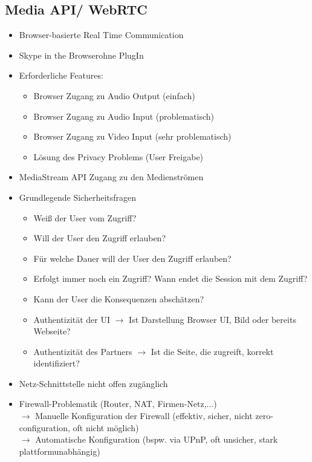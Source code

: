 \documentclass{article} %
\begin{document}
	\subsection{Media API/ WebRTC}
		\begin{itemize}
			\item Browser-basierte Real Time Communication
			\item \glqq Skype in the Browser\grqq ohne PlugIn
			\item Erforderliche Features:
			\begin{itemize}
				\item Browser Zugang zu Audio Output (einfach)
				\item Browser Zugang zu Audio Input (problematisch)
				\item Browser Zugang zu Video Input (sehr problematisch)
				\item Lösung des Privacy Problems (User Freigabe)
			\end{itemize}
			\item MediaStream API Zugang zu den Medienströmen
			\item Grundlegende Sicherheitsfragen
			\begin{itemize}
				\item Weiß der User vom Zugriff?
				\item Will der User den Zugriff erlauben?
				\item Für welche Dauer will der User den Zugriff erlauben?
				\item Erfolgt immer noch ein Zugriff? Wann endet die Session mit dem Zugriff?
				\item Kann der User die Konsequenzen abschätzen?
				\item Authentizität der UI $\rightarrow$ Ist Darstellung Browser UI, Bild oder bereits Webseite?
				\item Authentizität des Partners $\rightarrow$ Ist die Seite, die zugreift, korrekt identifiziert?
			\end{itemize}
			\item Netz-Schnittstelle nicht offen zugänglich
			\item Firewall-Problematik (Router, NAT, Firmen-Netz,...)\\
			$\rightarrow$ Manuelle Konfiguration der Firewall (effektiv, sicher, nicht zero-configuration, oft nicht möglich)\\
			$\rightarrow$ Automatische Konfiguration (bspw. via UPnP, oft unsicher, stark plattformunabhängig)			
		\end{itemize}
\end{document}
